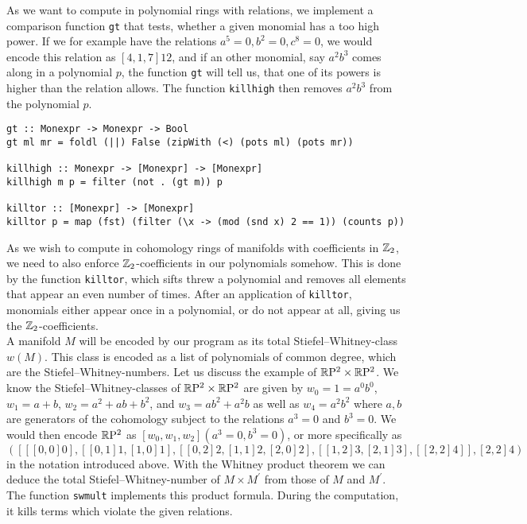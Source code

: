 As we want to compute in polynomial rings with relations, we implement a comparison function \texttt{gt} that tests, whether a given monomial has a too high power. 
If we for example have the relations $a^5 = 0, b^2 = 0, c^8 = 0$, we would encode this relation as $[4,1,7] 12$, and if an other monomial, say $a^2b^3$ comes along in a polynomial $p$, the function \texttt{gt} will tell us, that one of its powers is higher than the relation allows.
The function \texttt{killhigh} then removes $a^2b^3$ from the polynomial $p$.
\begin{lstlisting}
gt :: Monexpr -> Monexpr -> Bool
gt ml mr = foldl (||) False (zipWith (<) (pots ml) (pots mr))

killhigh :: Monexpr -> [Monexpr] -> [Monexpr]
killhigh m p = filter (not . (gt m)) p

killtor :: [Monexpr] -> [Monexpr]
killtor p = map (fst) (filter (\x -> (mod (snd x) 2 == 1)) (counts p))
\end{lstlisting}
As we wish to compute in cohomology rings of manifolds with coefficients in $\mathbb{Z}_2$, we need to also enforce $\mathbb{Z}_2$-coefficients in our polynomials somehow. 
This is done by the function \texttt{killtor}, which sifts threw a polynomial and removes all elements that appear an even number of times. 
After an application of \texttt{killtor}, monomials either appear once in a polynomial, or do not appear at all, giving us the $\mathbb{Z}_2$-coefficients.\\
A manifold $M$ will be encoded by our program as its total Stiefel--Whitney-class $w(M)$.
This class is encoded as a list of polynomials of common degree, which are the Stiefel--Whitney-numbers.
Let us discuss the example of $\mathbb{R}\mathrm{P}^2\times\mathbb{R}\mathrm{P}^2$.
We know the Stiefel--Whitney-classes of $\mathbb{R}\mathrm{P}^2\times\mathbb{R}\mathrm{P}^2$ are given by $w_0 = 1 = a^0b^0$, $w_1= a + b$, $w_2 = a^2 + ab + b^2$, and $w_3 = ab^2 + a^2b$ as well as $w_4= a^2 b^2$  where $a,b$ are generators of the cohomology subject to the relations $a^3 = 0$ and $b^3=0$.
We would then encode $\mathbb{R}\mathrm{P}^2$ as $[w_0, w_1, w_2] (a^3 = 0, b^3 = 0)$, or more specifically as 
\begin{equation*}
    ([[ [0,0] 0],[ [0,1] 1, [1,0] 1],[ [0,2] 2, [1,1] 2, [2,0] 2],[ [1,2] 3, [2,1] 3],[ [2,2] 4]], [2,2] 4)
\end{equation*}
in the notation introduced above.
With the Whitney product theorem we can deduce the total Stiefel--Whitney-number of $M\times M^\prime$ from those of $M$ and $M^\prime$.
The function \texttt{swmult} implements this product formula.
During the computation, it kills terms which violate the given relations.
